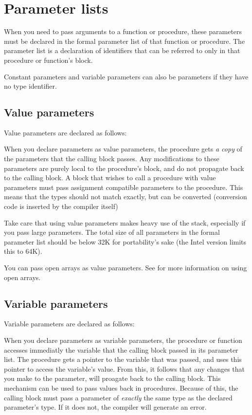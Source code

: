 \documentclass{report}
\begin{document}
\section{Parameter lists}
\label{se:Parameters}
When you need to pass arguments to a function or procedure, these parameters
must be declared in the formal parameter list of that function or procedure.
The parameter list is a declaration of identifiers that can be referred to
only in that procedure or function's block.

Constant parameters and variable parameters can also be 
parameters if they have no type identifier.
\subsection{Value parameters}
Value parameters are declared as follows:

When you declare parameters as value parameters, the procedure gets {\em
a copy} of the parameters that the calling block passes. Any modifications
to these parameters are purely local to the procedure's block, and do not
propagate back to the calling block.
A block that wishes to call a procedure with value parameters must pass
assignment compatible parameters to the procedure. This means that the types
should not match exactly, but can be converted (conversion code is inserted
by the compiler itself)

Take care that using value parameters makes heavy use of the stack,
especially if you pass large parameters. The total size of all parameters in
the formal parameter list should be below 32K for portability's sake (the
Intel version limits this to 64K).

You can pass open arrays as value parameters. See  for
more information on using open arrays.
\subsection{Variable parameters}
\label{se:varparams}
Variable parameters are declared as follows:

When you declare parameters as variable parameters, the procedure or
function accesses immediatly the variable that the calling block passed in
its parameter list. The procedure gets a pointer to the variable that was
passed, and uses this pointer to access the variable's value.
From this, it follows that any changes that you make to the parameter, will
proagate back to the calling block. This mechanism can be used to pass
values back in procedures.
Because of this, the calling block must pass a parameter of {\em exactly}
the same type as the declared parameter's type. If it does not, the compiler
will generate an error.
\end{document}
